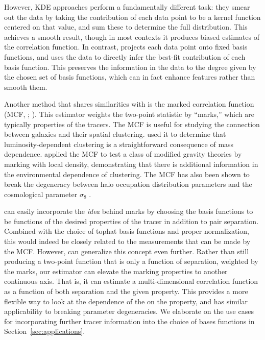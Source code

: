 However, KDE approaches perform a fundamentally different task: they smear out the data by taking the contribution of each data point to be a kernel function centered on that value, and sum these to determine the full distribution.
This achieves a smooth result, though in most contexts it produces biased estimates of the correlation function.
In contrast, \est projects each data point onto fixed basis functions, and uses the data to directly infer the best-fit contribution of each basis function.
This preserves the information in the data to the degree given by the chosen set of basis functions, which can in fact enhance features rather than smooth them.

Another method that shares similarities with \est is the marked correlation function (MCF, \citealt{Beisbart2000}; \citealt{Sheth2005}).
This estimator weights the two-point statistic by ``marks,'' which are typically properties of the tracers.
The MCF is useful for studying the connection between galaxies and their spatial clustering.
\cite{Skibba2006} used it to determine that luminosity-dependent clustering is a straightforward consequence of mass dependence.
\cite{Armijo2018} applied the MCF to test a class of modified gravity theories by marking with local density, demonstrating that there is additional information in the environmental dependence of clustering.
The MCF has also been shown to break the degeneracy between halo occupation distribution parameters and the cosmological parameter $\sigma_8$ \citep{WhitePadmanabhan2009}.

\Est can easily incorporate the \textit{idea} behind marks by choosing the basis functions to be functions of the desired properties of the tracer in addition to pair separation.
Combined with the choice of tophat basis functions and proper normalization, this would indeed be closely related to the measurements that can be made by the MCF.
However, \est can generalize this concept even further. 
Rather than still producing a two-point function that is only a function of separation, weighted by the marks, our estimator can elevate the marking properties to another continuous axis.
That is, it can estimate a multi-dimensional correlation function as a function of both separation and the given property.
This provides a more flexible way to look at the dependence of the \cf on the property, and has similar applicability to breaking parameter degeneracies.
We elaborate on the use cases for incorporating further tracer information into the choice of bases functions in Section~\ref{sec:applications}.

